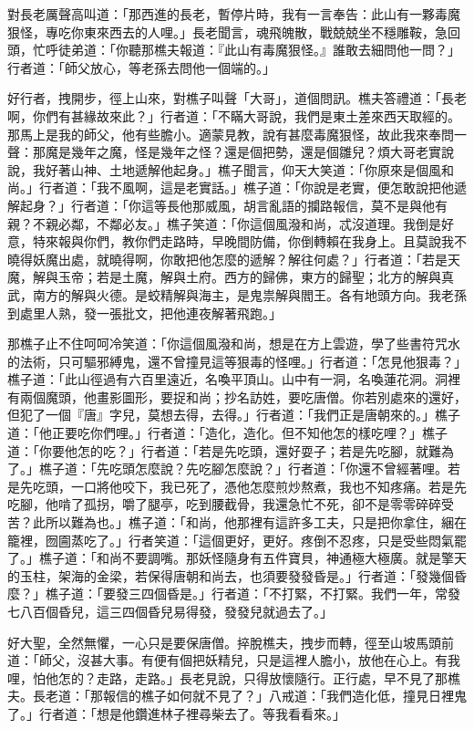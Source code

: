 對長老厲聲高叫道：「那西進的長老，暫停片時，我有一言奉告：此山有一夥毒魔狠怪，專吃你東來西去的人哩。」長老聞言，魂飛魄散，戰兢兢坐不穩雕鞍，急回頭，忙呼徒弟道：「你聽那樵夫報道：『此山有毒魔狠怪。』誰敢去細問他一問？」行者道：「師父放心，等老孫去問他一個端的。」

好行者，拽開步，徑上山來，對樵子叫聲「大哥」，道個問訊。樵夫答禮道：「長老啊，你們有甚緣故來此？」行者道：「不瞞大哥說，我們是東土差來西天取經的。那馬上是我的師父，他有些膽小。適蒙見教，說有甚麼毒魔狠怪，故此我來奉問一聲：那魔是幾年之魔，怪是幾年之怪？還是個把勢，還是個雛兒？煩大哥老實說說，我好著山神、土地遞解他起身。」樵子聞言，仰天大笑道：「你原來是個風和尚。」行者道：「我不風啊，這是老實話。」樵子道：「你說是老實，便怎敢說把他遞解起身？」行者道：「你這等長他那威風，胡言亂語的攔路報信，莫不是與他有親？不親必鄰，不鄰必友。」樵子笑道：「你這個風潑和尚，忒沒道理。我倒是好意，特來報與你們，教你們走路時，早晚間防備，你倒轉賴在我身上。且莫說我不曉得妖魔出處，就曉得啊，你敢把他怎麼的遞解？解往何處？」行者道：「若是天魔，解與玉帝；若是土魔，解與土府。西方的歸佛，東方的歸聖；北方的解與真武，南方的解與火德。是蛟精解與海主，是鬼祟解與閻王。各有地頭方向。我老孫到處里人熟，發一張批文，把他連夜解著飛跑。」

那樵子止不住呵呵冷笑道：「你這個風潑和尚，想是在方上雲遊，學了些書符咒水的法術，只可驅邪縛鬼，還不曾撞見這等狠毒的怪哩。」行者道：「怎見他狠毒？」樵子道：「此山徑過有六百里遠近，名喚平頂山。山中有一洞，名喚蓮花洞。洞裡有兩個魔頭，他畫影圖形，要捉和尚；抄名訪姓，要吃唐僧。你若別處來的還好，但犯了一個『唐』字兒，莫想去得，去得。」行者道：「我們正是唐朝來的。」樵子道：「他正要吃你們哩。」行者道：「造化，造化。但不知他怎的樣吃哩？」樵子道：「你要他怎的吃？」行者道：「若是先吃頭，還好耍子；若是先吃腳，就難為了。」樵子道：「先吃頭怎麼說？先吃腳怎麼說？」行者道：「你還不曾經著哩。若是先吃頭，一口將他咬下，我已死了，憑他怎麼煎炒熬煮，我也不知疼痛。若是先吃腳，他啃了孤拐，嚼了腿亭，吃到腰截骨，我還急忙不死，卻不是零零碎碎受苦？此所以難為也。」樵子道：「和尚，他那裡有這許多工夫，只是把你拿住，綑在籠裡，囫圇蒸吃了。」行者笑道：「這個更好，更好。疼倒不忍疼，只是受些悶氣罷了。」樵子道：「和尚不要調嘴。那妖怪隨身有五件寶貝，神通極大極廣。就是擎天的玉柱，架海的金梁，若保得唐朝和尚去，也須要發發昏是。」行者道：「發幾個昏麼？」樵子道：「要發三四個昏是。」行者道：「不打緊，不打緊。我們一年，常發七八百個昏兒，這三四個昏兒易得發，發發兒就過去了。」

好大聖，全然無懼，一心只是要保唐僧。捽脫樵夫，拽步而轉，徑至山坡馬頭前道：「師父，沒甚大事。有便有個把妖精兒，只是這裡人膽小，放他在心上。有我哩，怕他怎的？走路，走路。」長老見說，只得放懷隨行。正行處，早不見了那樵夫。長老道：「那報信的樵子如何就不見了？」八戒道：「我們造化低，撞見日裡鬼了。」行者道：「想是他鑽進林子裡尋柴去了。等我看看來。」

